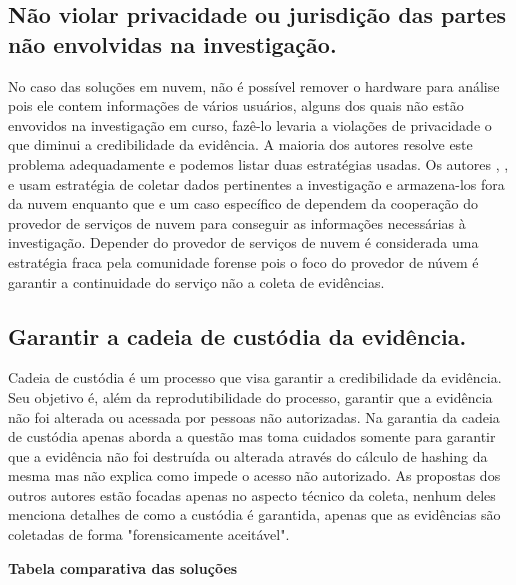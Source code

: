 \documentclass[
	12pt,				%
	openright,			%
	oneside,			%
	a4paper,			%
	english,			%
	brazil,				%
	]{abntex2}
\begin{document}
\subsection{Não violar privacidade ou jurisdição das partes não envolvidas na investigação.}
\label{chp:privacidade-revisao}

No caso das soluções em nuvem, não é possível remover o hardware para análise pois ele contem informações de vários usuários, alguns dos quais não estão envovidos na 
investigação em curso, fazê-lo levaria a violações de privacidade o que diminui a credibilidade da evidência. A maioria dos autores resolve este problema adequadamente 
e podemos listar duas estratégias usadas. Os autores \cite{Reichert2015}, \cite{George2012}, \cite{Poisel2013} e \cite{Dykstra2013} usam estratégia de coletar dados 
pertinentes a investigação e armazena-los fora da nuvem enquanto que \cite{Sang2013} e um caso específico de \cite{George2012} dependem da cooperação do provedor de 
serviços de nuvem para conseguir as informações necessárias à investigação. Depender do provedor de serviços de nuvem é considerada uma estratégia fraca pela comunidade 
forense pois o foco do provedor de núvem é garantir a continuidade do serviço não a coleta de evidências.

\subsection{Garantir a cadeia de custódia da evidência.}
\label{chp:custodia-revisao}

Cadeia de custódia é um processo que visa garantir a credibilidade da evidência. Seu objetivo é, além da reprodutibilidade do processo, garantir que a evidência não 
foi alterada ou acessada por pessoas não autorizadas. Na garantia da cadeia de custódia apenas \cite{Sang2013} aborda a questão mas toma cuidados somente para  
garantir que a evidência não foi destruída ou alterada através do cálculo de hashing da mesma mas não explica como impede o acesso não autorizado. 
As propostas dos outros autores estão focadas apenas no aspecto técnico da coleta, nenhum deles menciona detalhes de como a custódia é garantida, apenas que as 
evidências são coletadas de forma "forensicamente aceitável".

\textbf{Tabela comparativa das soluções}
\end{document}
